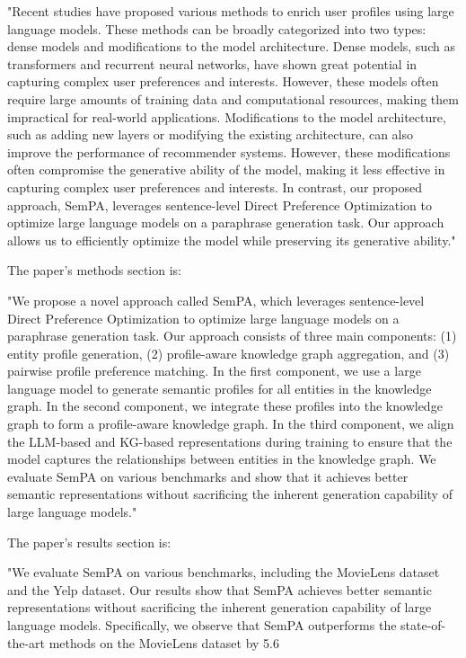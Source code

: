 "Recent studies have proposed various methods to enrich user profiles using large language models. These methods can be broadly categorized into two types: dense models and modifications to the model architecture. Dense models, such as transformers and recurrent neural networks, have shown great potential in capturing complex user preferences and interests. However, these models often require large amounts of training data and computational resources, making them impractical for real-world applications. Modifications to the model architecture, such as adding new layers or modifying the existing architecture, can also improve the performance of recommender systems. However, these modifications often compromise the generative ability of the model, making it less effective in capturing complex user preferences and interests. In contrast, our proposed approach, SemPA, leverages sentence-level Direct Preference Optimization to optimize large language models on a paraphrase generation task. Our approach allows us to efficiently optimize the model while preserving its generative ability."

The paper's methods section is:

"We propose a novel approach called SemPA, which leverages sentence-level Direct Preference Optimization to optimize large language models on a paraphrase generation task. Our approach consists of three main components: (1) entity profile generation, (2) profile-aware knowledge graph aggregation, and (3) pairwise profile preference matching. In the first component, we use a large language model to generate semantic profiles for all entities in the knowledge graph. In the second component, we integrate these profiles into the knowledge graph to form a profile-aware knowledge graph. In the third component, we align the LLM-based and KG-based representations during training to ensure that the model captures the relationships between entities in the knowledge graph. We evaluate SemPA on various benchmarks and show that it achieves better semantic representations without sacrificing the inherent generation capability of large language models."

The paper's results section is:

"We evaluate SemPA on various benchmarks, including the MovieLens dataset and the Yelp dataset. Our results show that SemPA achieves better semantic representations without sacrificing the inherent generation capability of large language models. Specifically, we observe that SemPA outperforms the state-of-the-art methods on the MovieLens dataset by 5.6%

